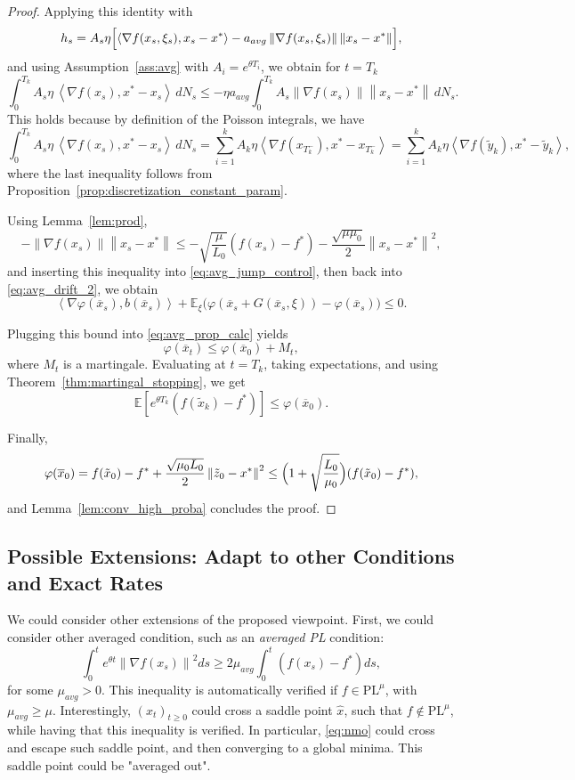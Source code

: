 \documentclass{article}
\def\xcont{(x_t)_{t\ge 0}}
\def\pl{{\text{PL}^\mu}}
\newcommand{\E}[1]{\mathbb{E}\left[#1 \right]}
\newcommand{\norm}[1]{\left\lVert#1\right\rVert}
\newcommand{\dotprod}[1]{\left< #1\right>}
\theoremstyle{plain}
\theoremstyle{definition}
\theoremstyle{remark}
\begin{document}
\begin{proof}
Applying this identity with
\[
h_s
=
A_s\eta\Bigl[
\dotprod{\nabla f(x_s,\xi_s),x_s-x^\ast}
-
a_{avg}\norm{\nabla f(x_s,\xi_s)}\norm{x_s-x^\ast}
\Bigr],
\]
and using Assumption~\ref{ass:avg} with $A_i=e^{\theta T_i}$, we obtain for $t=T_k$
\begin{equation}\label{eq:avg_jump_control}
\int_0^{T_k} A_s\eta\,\dotprod{\nabla f(x_s),x^\ast-x_s}\,dN_s
\le
-\eta a_{avg}\int_0^{T_k} A_s\norm{\nabla f(x_s)}\norm{x_s-x^\ast}\,dN_s.
\end{equation}
This holds because by definition of the Poisson integrals, we have
\[\int_0^{T_k} A_s\eta\,\dotprod{\nabla f(x_s),x^\ast-x_s}\,dN_s = \sum_{i=1}^k A_k\eta \dotprod{\nabla f(x_{T_k^-}),x^\ast-x_{T_k^-}} = \sum_{i=1}^k A_k\eta \dotprod{\nabla f(\tilde y_k),x^\ast-\tilde y_k},\]
where the last inequality follows from Proposition~\ref{prop:discretization_constant_param}.

Using Lemma~\ref{lem:prod},
\[
-\norm{\nabla f(x_s)}\norm{x_s-x^\ast}
\le
-\sqrt{\frac{\mu}{L_0}}(f(x_s)-f^\ast)
-
\frac{\sqrt{\mu\mu_0}}{2}\norm{x_s-x^\ast}^2,
\]
and inserting this inequality into \eqref{eq:avg_jump_control},
then back into \eqref{eq:avg_drift_2},
we obtain
\[
\dotprod{\nabla \varphi(\overline{x}_s),b(\overline{x}_s)}
+
\mathbb{E}_{\xi}\!\bigl(
\varphi(\overline{x}_s+G(\overline{x}_s,\xi))-\varphi(\overline{x}_s)
\bigr)
\le 0.
\]

Plugging this bound into \eqref{eq:avg_prop_calc} yields
\[
\varphi(\overline{x}_t)\le \varphi(\overline{x}_0)+M_t,
\]
where $M_t$ is a martingale.
Evaluating at $t=T_k$, taking expectations, and using
Theorem~\ref{thm:martingal_stopping}, we get
\[
\E{e^{\theta T_k}(f(\tilde x_k)-f^\ast)}\le \varphi(\overline{x}_0).
\]

Finally,
\[
\varphi(\overline{x}_0)
=
f(\tilde x_0)-f^\ast+\frac{\sqrt{\mu_0L_0}}{2}\norm{\tilde z_0-x^\ast}^2
\le
\Bigl(1+\sqrt{\frac{L_0}{\mu_0}}\Bigr)(f(\tilde x_0)-f^\ast),
\]
and Lemma~\ref{lem:conv_high_proba} concludes the proof.
\end{proof}











\subsection{Possible Extensions: Adapt to other Conditions and Exact Rates}\label{app:exact}
We could consider other extensions of the proposed viewpoint. First, we could consider other averaged condition, such as an \textit{averaged PL} condition:
\[ \int_0^t e^{\theta t}\norm{\nabla f(x_s)}^2ds \ge 2\mu_{avg}\int_0^t (f(x_s)-f^\ast )ds, \]
for some $\mu_{avg} > 0$.
This inequality is automatically verified if $f \in \pl$, with $\mu_{avg} \ge \mu$. Interestingly, $\xcont$ could cross a saddle point $\hat x$, such that $f \notin \pl$, while having that this inequality is verified. In particular, \eqref{eq:nmo} could cross and escape such saddle point, and then converging to a global minima. This saddle point could be "averaged out".
\end{document}
